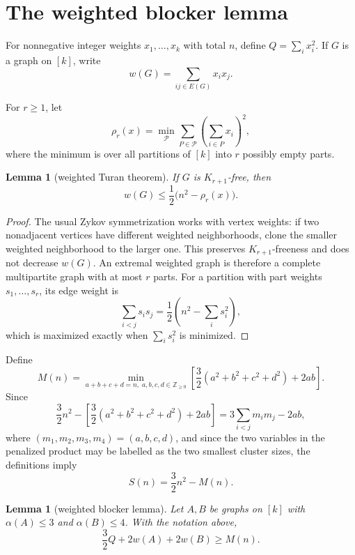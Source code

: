 \documentclass[12pt]{article}
\theoremstyle{plain}
\newtheorem{lemma}[theorem]{Lemma}
\theoremstyle{definition}
\theoremstyle{remark}
\begin{document}
\section{The weighted blocker lemma}\label{sec:blocker}

For nonnegative integer weights \(x_1,\ldots,x_k\) with total \(n\), define
\(Q=\sum_i x_i^2\).  If \(G\) is a graph on \([k]\), write
\[
  w(G)=\sum_{ij\in E(G)}x_i x_j.
\]

For \(r\ge1\), let
\[
  \rho_r(x)=\min_{\mathcal P}\sum_{P\in\mathcal P}
  \left(\sum_{i\in P}x_i\right)^2,
\]
where the minimum is over all partitions of \([k]\) into \(r\) possibly empty
parts.

\begin{lemma}[weighted Turan theorem]\label{lem:weighted-turan}
If \(G\) is \(K_{r+1}\)-free, then
\begin{equation}\label{eq:weighted-turan}
  w(G)\le\frac12\bigl(n^2-\rho_r(x)\bigr).
\end{equation}
\end{lemma}

\begin{proof}
The usual Zykov symmetrization works with vertex weights: if two nonadjacent
vertices have different weighted neighborhoods, clone the smaller weighted
neighborhood to the larger one.  This preserves \(K_{r+1}\)-freeness and does
not decrease \(w(G)\).  An extremal weighted graph is therefore a complete
multipartite graph with at most \(r\) parts.  For a partition with part weights
\(s_1,\ldots,s_r\), its edge weight is
\[
  \sum_{i<j}s_i s_j=\frac12\left(n^2-\sum_i s_i^2\right),
\]
which is maximized exactly when \(\sum_i s_i^2\) is minimized.
\end{proof}

Define
\begin{equation}\label{eq:Mdef}
  M(n)=\min_{a+b+c+d=n,\;a,b,c,d\in\mathbb Z_{\ge0}}
  \left[\frac32(a^2+b^2+c^2+d^2)+2ab\right].
\end{equation}
Since
\[
  \frac32n^2-
  \left[\frac32(a^2+b^2+c^2+d^2)+2ab\right]
  =3\sum_{i<j}m_i m_j-2ab,
\]
where \((m_1,m_2,m_3,m_4)=(a,b,c,d)\), and since the two variables in the
penalized product may be labelled as the two smallest cluster sizes, the
definitions imply
\begin{equation}\label{eq:S-M}
  S(n)=\frac32 n^2-M(n).
\end{equation}

\begin{lemma}[weighted blocker lemma]\label{lem:blocker}
Let \(A,B\) be graphs on \([k]\) with \(\alpha(A)\le3\) and
\(\alpha(B)\le4\).  With the notation above,
\begin{equation}\label{eq:blocker}
  \frac32Q+2w(A)+2w(B)\ge M(n).
\end{equation}
\end{lemma}
\end{document}

